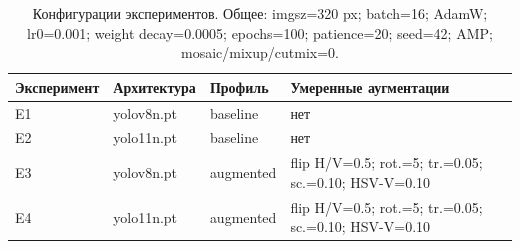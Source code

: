 \begin{table}[t]
\centering
\caption{Конфигурации экспериментов. Общее: imgsz=320 px; batch=16; AdamW; lr0=0.001; weight decay=0.0005; epochs=100; patience=20; seed=42; AMP; mosaic/mixup/cutmix=0.}
\label{tab:setup}
\scriptsize
\begin{tabular}{lll p{}}
\hline
Эксперимент & Архитектура & Профиль & Умеренные аугментации \\
\hline
E1 & yolov8n.pt & baseline & нет \\
E2 & yolo11n.pt & baseline & нет \\
E3 & yolov8n.pt & augmented & flip H/V=0.5; rot.=5; tr.=0.05; sc.=0.10; HSV-V=0.10 \\
E4 & yolo11n.pt & augmented & flip H/V=0.5; rot.=5; tr.=0.05; sc.=0.10; HSV-V=0.10 \\
\hline
\end{tabular}
\end{table}
